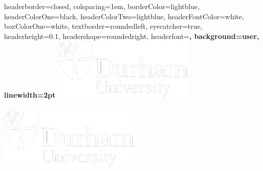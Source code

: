 \documentclass[landscape,a2paper,fontscale=1]{baposter} %
\begin{document}
\begin{poster}
{
headerborder=closed, %
colspacing=1em, %
borderColor=lightblue, %
headerColorOne=black, %
headerColorTwo=lightblue, %
headerFontColor=white, %
boxColorOne=white, %
textborder=roundedleft, %
eyecatcher=true, %
headerheight=0.1\textheight, %
headershape=roundedright, %
headerfont=\Large\bf\textsc, %
background=user,
linewidth=2pt %
}
%
{\includegraphics[height=8em]{DUlogo.png}} %
{\bf\textcolor{white}{\textsc{Modelling Rotating Black Holes}\vspace{0.5em}}} %
{\textcolor{white}{\textsc{ Joseph Sweeney \hspace{12pt} Supervised by Kasper Peeters}}} %
{\includegraphics[height=8em]{DUlogo.png}} %


\end{poster}
\end{document}
